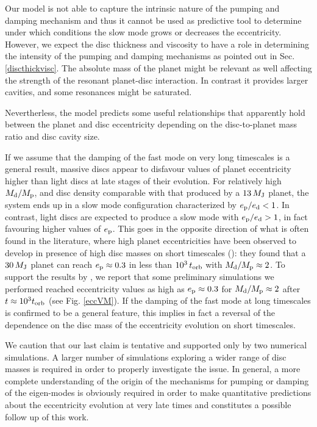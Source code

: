 \documentclass[usenatbib,a4paper,times,fleqn]{mnras}
\begin{document}
Our model is not able to capture the intrinsic nature of the pumping and damping mechanism and thus it cannot be used as predictive tool to determine under which conditions the slow mode grows or decreases the eccentricity. However, we expect the disc thickness and viscosity to have a role in determining the intensity of the pumping and damping mechanisms as pointed out in Sec. \ref{discthickvisc}. The absolute mass of the planet might be relevant as well affecting the strength of the resonant planet-disc interaction. In contrast it provides larger cavities, and some resonances might be saturated.

Nevertherless, the model predicts some useful relationships that apparently hold between the planet and disc eccentricity depending on the disc-to-planet mass ratio and disc cavity size.

If we assume that the damping of the fast mode on very long timescales is a general result, massive discs appear to disfavour values of planet eccentricity higher than light discs at late stages of their evolution. For relatively high $M_{\rm d}/M_{\rm p}$, and disc density comparable with that produced by a $13\,M_{\rm J}$ planet, the system ends up in a slow mode configuration characterized by $e_{\rm p}/e_{\rm d}<1$. In contrast, light discs are expected to produce a slow mode with $e_{\rm p}/e_{\rm d}>1$, in fact favouring higher values of $e_{\rm p}$.
This goes in the opposite direction of what is often found in the literature, where high planet eccentricities have been observed to develop in presence of high disc masses on short timescales (\citealp{papaloizou2001}): they found that a $30\,M_{\rm J}$ planet can reach $e_{\rm p}\approx 0.3$ in less than $10^3\, t_{\rm orb}$ with $M_{\rm d}/M_{\rm p}\approx 2$. To support the results by \citet{papaloizou2001}, we report that some preliminary simulations we performed reached eccentricity values as high as $e_{\rm p}\approx 0.3$ for $M_{\rm d}/M_{\rm p}\approx 2$ after $t\approx 10^3 t_{\rm orb}$ (see Fig. \ref{eccVM}). If the damping of the fast mode at long timescales is confirmed to be a general feature, this implies in fact a reversal of the dependence on the disc mass of the eccentricity evolution on short timescales.

We caution that our last claim is tentative and supported only by two numerical simulations. A larger number of simulations exploring a wider range of disc masses is required in order to properly investigate the issue. In general, a more complete understanding of the origin of the mechanisms for pumping or damping of the eigen-modes is obviously required in order to make quantitative predictions about the eccentricity evolution at very late times and constitutes a possible follow up of this work. 
\end{document}
